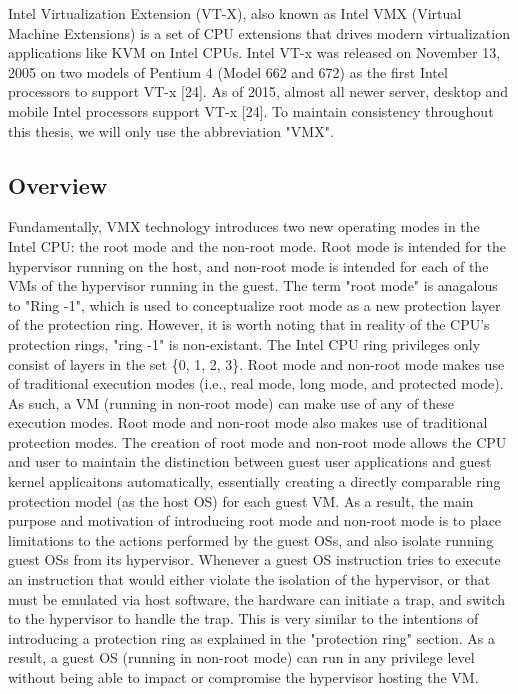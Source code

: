 \documentclass{report}
\begin{document}
\begin{spacing}{1.5}
{\large
Intel Virtualization Extension (VT-X), also known as Intel VMX (Virtual Machine Extensions) is a set of CPU extensions that drives modern virtualization applications like KVM on Intel CPUs. Intel VT-x was released on November 13, 2005 on two models of Pentium 4 (Model 662 and 672) as the first Intel processors to support VT-x [24]. As of 2015, almost all newer server, desktop and mobile Intel processors support VT-x [24]. To maintain consistency throughout this thesis, we will only use the abbreviation "VMX".
\newline
}


\subsection{Overview}

{\large
Fundamentally, VMX technology introduces two new operating modes in the Intel CPU: the root mode and the non-root mode. Root mode is intended for the hypervisor running on the host, and non-root mode is intended for each of the VMs of the hypervisor running in the guest. The term "root mode" is anagalous to "Ring -1", which is used to conceptualize root mode as a new protection layer of the protection ring. However, it is worth noting that in reality of the CPU's protection rings, "ring -1" is non-existant. The Intel CPU ring privileges only consist of layers in the set \{0, 1, 2, 3\}. Root mode and non-root mode makes use of traditional execution modes (i.e., real mode, long mode, and protected mode). As such, a VM (running in non-root mode) can make use of any of these execution modes. Root mode and non-root mode also makes use of traditional protection modes. The creation of root mode and non-root mode allows the CPU and user to maintain the distinction between guest user applications and guest kernel applicaitons automatically, essentially creating a directly comparable ring protection model (as the host OS) for each guest VM. As a result, the main purpose and motivation of introducing root mode and non-root mode is to place limitations to the actions performed by the guest OSs, and also isolate running guest OSs from its hypervisor. Whenever a guest OS instruction tries to execute an instruction that would either violate the isolation of the hypervisor, or that must be emulated via host software, the hardware can initiate a trap, and switch to the hypervisor to handle the trap. This is very similar to the intentions of introducing a protection ring as explained in the "protection ring" section. As a result, a guest OS (running in non-root mode) can run in any privilege level without being able to impact or compromise the hypervisor hosting the VM.
\newline
}




\end{spacing}
\end{document}
